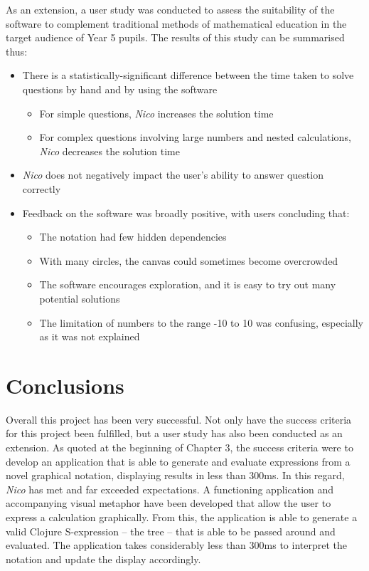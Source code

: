 \documentclass[12pt,twoside,notitlepage,xetex]{report}
\begin{document}
As an extension, a user study was conducted to assess the suitability of the software to complement traditional methods of mathematical education in the target audience of Year 5 pupils.  The results of this study can be summarised thus:
\begin{itemize}
\item There is a statistically-significant difference between the time taken to solve questions by hand and by using the software
\begin{itemize}
\item For simple questions, \emph{Nico} increases the solution time
\item For complex questions involving large numbers and nested calculations, \emph{Nico} decreases the solution time
\end{itemize}
\item \emph{Nico} does not negatively impact the user's ability to answer question correctly
\item Feedback on the software was broadly positive, with users concluding that:
\begin{itemize}
\item The notation had few hidden dependencies
\item With many circles, the canvas could sometimes become overcrowded
\item The software encourages exploration, and it is easy to try out many potential solutions
\item The limitation of numbers to the range -10 to 10 was confusing, especially as it was not explained
\end{itemize}
\end{itemize}

\cleardoublepage
\chapter{Conclusions}

Overall this project has been very successful.  Not only have the success criteria for this project been fulfilled, but a user study has also been conducted as an extension.  As quoted at the beginning of Chapter 3, the success criteria were to develop an application that is able to generate and evaluate expressions from a novel graphical notation, displaying results in less than 300ms.  In this regard, \emph{Nico} has met and far exceeded expectations.  A functioning application and accompanying visual metaphor have been developed that allow the user to express a calculation graphically.  From this, the application is able to generate a valid Clojure S-expression -- the tree -- that is able to be passed around and evaluated.  The application takes considerably less than 300ms to interpret the notation and update the display accordingly.
\end{document}
